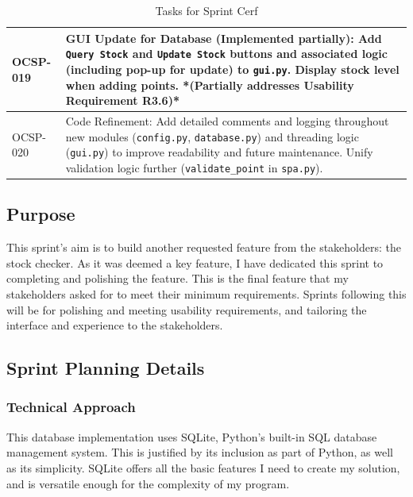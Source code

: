 \begin{table}[htbp]
\begin{tabularx}{\textwidth}{|l|X|}
	\hline
	OCSP-019 & GUI Update for Database (Implemented partially): Add \texttt{Query Stock} and \texttt{Update Stock} buttons and associated logic (including pop-up for update) to \texttt{gui.py}. Display stock level when adding points. *(Partially addresses Usability Requirement R3.6)* \\
	\hline
	OCSP-020 & Code Refinement: Add detailed comments and logging throughout new modules (\texttt{config.py}, \texttt{database.py}) and threading logic (\texttt{gui.py}) to improve readability and future maintenance. Unify validation logic further (\texttt{validate\_point} in \texttt{spa.py}). \\
	\hline
\end{tabularx}
\caption{Tasks for Sprint Cerf}
\end{table}

\subsection{Purpose}

This sprint's aim is to build another requested feature from the stakeholders: the stock checker. As it was deemed a key feature, I have dedicated this sprint to completing and polishing the feature. This is the final feature that my stakeholders asked for to meet their minimum requirements. Sprints following this will be for polishing and meeting usability requirements, and tailoring the interface and experience to the stakeholders.


\clearpage
\subsection{Sprint Planning Details}

\subsubsection{Technical Approach}

This database implementation uses SQLite, Python's built-in SQL database management system. This is justified by its inclusion as part of Python, as well as its simplicity. SQLite offers all the basic features I need to create my solution, and is versatile enough for the complexity of my program.


